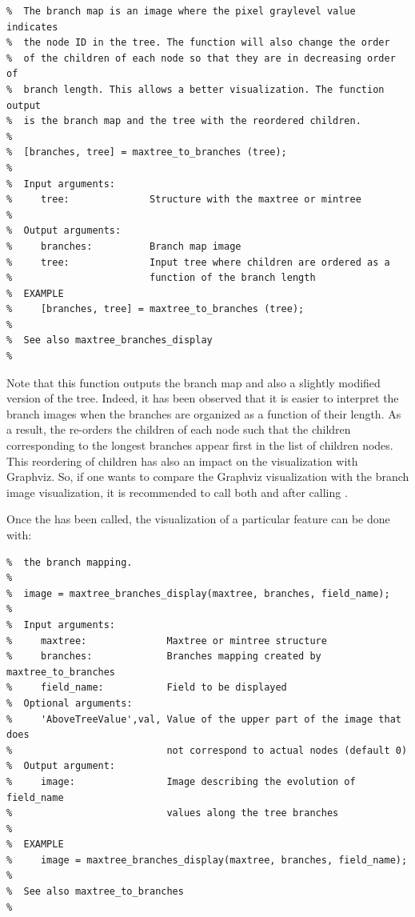 \documentclass[DIV=calc, paper=a4, fontsize=11pt]{scrartcl}	 %
\begin{document}
\begin{lstlisting}[aboveskip=0.5 \baselineskip]
%  maxtree_to_branches creates a "branches" map from a maxtree or mintree 
%  The branch map is an image where the pixel graylevel value indicates 
%  the node ID in the tree. The function will also change the order
%  of the children of each node so that they are in decreasing order of 
%  branch length. This allows a better visualization. The function output
%  is the branch map and the tree with the reordered children. 
% 
%  [branches, tree] = maxtree_to_branches (tree);
%
%  Input arguments:
%     tree:              Structure with the maxtree or mintree 
%
%  Output arguments:
%     branches:          Branch map image
%     tree:              Input tree where children are ordered as a
%                        function of the branch length
%  EXAMPLE
%     [branches, tree] = maxtree_to_branches (tree);
%
%  See also maxtree_branches_display
%
\end{lstlisting}
Note that this function outputs the branch map  and also a slightly modified version of the tree. Indeed, it has been observed that it is easier to interpret the branch images when the branches are organized as a function of their length. As a result, the  re-orders the children of each node such that the children corresponding to the longest branches appear first in the list of children nodes. This reordering of children has also an impact on the visualization with Graphviz. So, if one wants to compare the Graphviz visualization with the branch image visualization, it is recommended to call both  and  after calling .

Once the  has been called, the visualization of a particular feature can be done with: 
\begin{lstlisting}[aboveskip=0.5 \baselineskip]
%  maxtree_branches_display displays a maxtree field as an image following
%  the branch mapping.
%
%  image = maxtree_branches_display(maxtree, branches, field_name);
%
%  Input arguments:
%     maxtree:              Maxtree or mintree structure
%     branches:             Branches mapping created by maxtree_to_branches
%     field_name:           Field to be displayed
%  Optional arguments:
%     'AboveTreeValue',val, Value of the upper part of the image that does
%                           not correspond to actual nodes (default 0)
%  Output argument:        
%     image:                Image describing the evolution of field_name
%                           values along the tree branches
%
%  EXAMPLE 
%     image = maxtree_branches_display(maxtree, branches, field_name);
%
%  See also maxtree_to_branches
%
\end{lstlisting}
\end{document}
